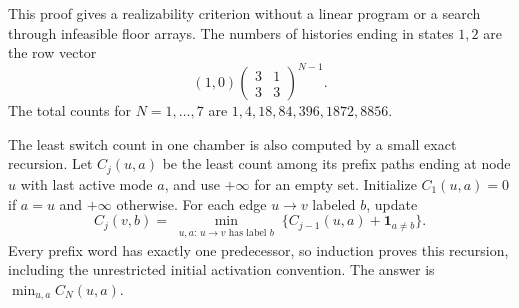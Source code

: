 This proof gives a realizability criterion without a linear program or a
search through infeasible floor arrays. The numbers of histories ending
in states $1,2$ are the row vector
\begin{equation}\label{eq:floor-count}
 (1,0)\begin{pmatrix}3&1\\3&3\end{pmatrix}^{N-1}.
\end{equation}
The total counts for $N=1,\ldots,7$ are
$1,4,18,84,396,1872,8856$.

The least switch count in one chamber is also computed by a small exact
recursion. Let $C_j(u,a)$ be the least count among its prefix paths ending
at node $u$ with last active mode $a$, and use $+\infty$ for an empty set.
Initialize $C_1(u,a)=0$ if $a=u$ and $+\infty$ otherwise. For each edge
$u\to v$ labeled $b$, update
\begin{equation}\label{eq:floor-cost-DP}
 C_j(v,b)=\min_{\substack{u,a:\,u\to v\text{ has label }b}}
       \{C_{j-1}(u,a)+\mathbf1_{a\ne b}\}.
\end{equation}
Every prefix word has exactly one predecessor, so induction proves this
recursion, including the unrestricted initial activation convention.
The answer is $\min_{u,a}C_N(u,a)$.

